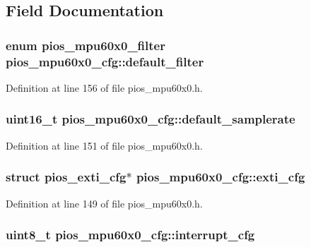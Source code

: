 \subsection{\-Field \-Documentation}
\hypertarget{structpios__mpu60x0__cfg_a50a6612b9fff2bd96908996d7d734ef3}{
\subsubsection[{default\-\_\-filter}]{\setlength{\rightskip}{0pt plus 5cm}enum {\bf pios\-\_\-mpu60x0\-\_\-filter} {\bf pios\-\_\-mpu60x0\-\_\-cfg\-::default\-\_\-filter}}}\label{structpios__mpu60x0__cfg_a50a6612b9fff2bd96908996d7d734ef3}


\-Definition at line 156 of file pios\-\_\-mpu60x0.\-h.

\hypertarget{structpios__mpu60x0__cfg_af4581a0013e107281a5ebefa0745d6ff}{
\subsubsection[{default\-\_\-samplerate}]{\setlength{\rightskip}{0pt plus 5cm}uint16\-\_\-t {\bf pios\-\_\-mpu60x0\-\_\-cfg\-::default\-\_\-samplerate}}}\label{structpios__mpu60x0__cfg_af4581a0013e107281a5ebefa0745d6ff}


\-Definition at line 151 of file pios\-\_\-mpu60x0.\-h.

\hypertarget{structpios__mpu60x0__cfg_a3060efb7fe61ef6816d0c76c464bd3f9}{
\subsubsection[{exti\-\_\-cfg}]{\setlength{\rightskip}{0pt plus 5cm}struct {\bf pios\-\_\-exti\-\_\-cfg}$\ast$ {\bf pios\-\_\-mpu60x0\-\_\-cfg\-::exti\-\_\-cfg}}}\label{structpios__mpu60x0__cfg_a3060efb7fe61ef6816d0c76c464bd3f9}


\-Definition at line 149 of file pios\-\_\-mpu60x0.\-h.

\hypertarget{structpios__mpu60x0__cfg_aeadd184c43fe44f818bba2b94d80e099}{
\subsubsection[{interrupt\-\_\-cfg}]{\setlength{\rightskip}{0pt plus 5cm}uint8\-\_\-t {\bf pios\-\_\-mpu60x0\-\_\-cfg\-::interrupt\-\_\-cfg}}}\label{structpios__mpu60x0__cfg_aeadd184c43fe44f818bba2b94d80e099}


